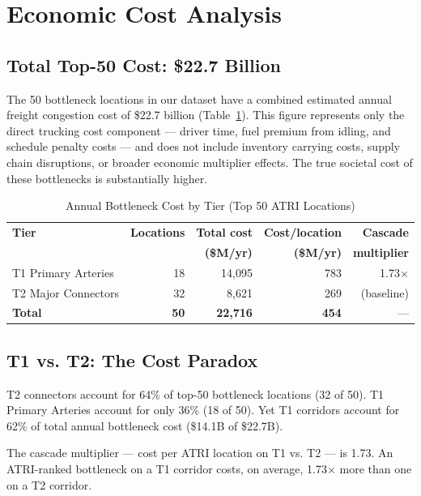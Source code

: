 \section{Economic Cost Analysis}

\subsection{Total Top-50 Cost: \$22.7 Billion}

The 50 bottleneck locations in our dataset have a combined estimated annual freight congestion cost of \$22.7 billion (Table~\ref{tab:tier-cost}). This figure represents only the direct trucking cost component --- driver time, fuel premium from idling, and schedule penalty costs --- and does not include inventory carrying costs, supply chain disruptions, or broader economic multiplier effects. The true societal cost of these bottlenecks is substantially higher.

\begin{table}[h!]
\centering
\caption{Annual Bottleneck Cost by Tier (Top 50 ATRI Locations)}
\label{tab:tier-cost}
\begin{tabular}{lrrrr}
\toprule
\textbf{Tier} & \textbf{Locations} & \textbf{Total cost} & \textbf{Cost/location} & \textbf{Cascade} \\
 & & \textbf{(\$M/yr)} & \textbf{(\$M/yr)} & \textbf{multiplier} \\
\midrule
T1 Primary Arteries & 18 & 14,095 & 783 & 1.73× \\
T2 Major Connectors & 32 & 8,621 & 269 & (baseline) \\
\midrule
\textbf{Total} & \textbf{50} & \textbf{22,716} & \textbf{454} & --- \\
\bottomrule
\end{tabular}
\end{table}

\subsection{T1 vs. T2: The Cost Paradox}

T2 connectors account for 64\% of top-50 bottleneck locations (32 of 50). T1 Primary Arteries account for only 36\% (18 of 50). Yet T1 corridors account for 62\% of total annual bottleneck cost (\$14.1B of \$22.7B).

The cascade multiplier --- cost per ATRI location on T1 vs. T2 --- is 1.73. An ATRI-ranked bottleneck on a T1 corridor costs, on average, 1.73× more than one on a T2 corridor.

